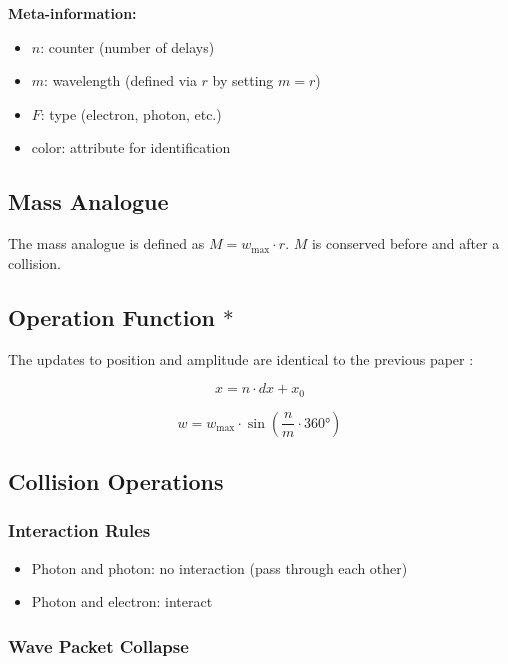 \documentclass[12pt,a4paper]{article}
\begin{document}
\textbf{Meta-information:}
\begin{itemize}
  \item $n$: counter (number of delays)
  \item $m$: wavelength (defined via $r$ by setting $m = r$)
  \item $F$: type (electron, photon, etc.)
  \item color: attribute for identification
\end{itemize}

\subsection{Mass Analogue}

The mass analogue is defined as $M = w_{\max} \cdot r$. $M$ is conserved before and after a collision.

\subsection{Operation Function $*$}

The updates to position and amplitude are identical to the previous paper \cite{ref4}:

\begin{equation}
  x = n \cdot dx + x_0
\end{equation}

\begin{equation}
  w = w_{\max} \cdot \sin\!\left(\frac{n}{m} \cdot 360°\right)
\end{equation}

\subsection{Collision Operations}

\subsubsection*{Interaction Rules}
\begin{itemize}
  \item Photon and photon: no interaction (pass through each other)
  \item Photon and electron: interact
\end{itemize}

\subsubsection*{Wave Packet Collapse}
\end{document}
